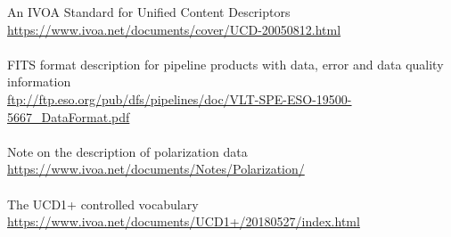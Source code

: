 \documentclass[a4paper,10pt]{book}
\begin{document}
An IVOA Standard for Unified Content Descriptors\\
\url{https://www.ivoa.net/documents/cover/UCD-20050812.html}\\
~\\
FITS format description for pipeline products with data, error and data quality information\\
\url{ftp://ftp.eso.org/pub/dfs/pipelines/doc/VLT-SPE-ESO-19500-5667_DataFormat.pdf}\\
~\\
Note on the description of polarization data\\
\url{https://www.ivoa.net/documents/Notes/Polarization/}\\
~\\
The UCD1+ controlled vocabulary\\
\url{https://www.ivoa.net/documents/UCD1+/20180527/index.html}\\
\end{document}
